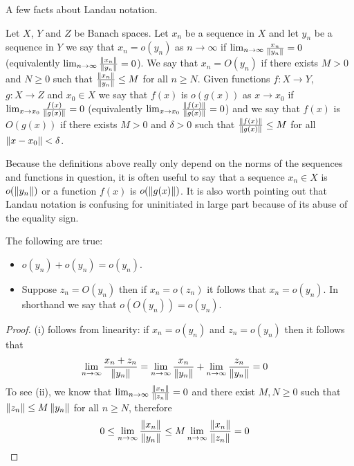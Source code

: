 A few facts about Landau notation.
\begin{defn}Let $X$, $Y$ and $Z$ be Banach spaces.  Let $x_n$ be a sequence in $X$ and let
  $y_n$ be a sequence in  $Y$ we say that $x_n = o(y_n)$
  as $n \to \infty$ if $\lim_{n \to \infty} \frac{x_n}{\left \lVert y_n \right \rVert} =
  0$ (equivalently $\lim_{n \to \infty} \frac{\left \lVert x_n \right \rVert}{\left \lVert y_n \right \rVert} =
  0$).  We say that $x_n = O(y_n)$ if there exists $M > 0$ and $N \geq
  0$ such that
  $\frac{\left \lVert x_n \right \rVert}{\left \lVert y_n \right \rVert}  \leq M$ for all $n \geq N$.  
Given functions $f : X \to Y$, $g : X \to Z$ and $x_0 \in X$ we say that
  $f(x)$ is $o(g(x))$ as $x \to x_0$ if $\lim_{x \to x_0}
  \frac{f(x)}{\left \lVert g(x) \right \rVert} = 0$ (equivalently $\lim_{x \to x_0}
  \frac{\left \lVert f(x) \right \rVert}{\left \lVert g(x) \right \rVert} = 0$) and we say that $f(x)$ is
  $O(g(x))$ if there exists $M > 0$ and $\delta > 0$ such that
  $\frac{\left \lVert f(x) \right \rVert}{\left \lVert g(x) \right \rVert} \leq M$ for all $\left \lVert x - x_0 \right \rVert < \delta$.
\end{defn}
Because the definitions above really only depend on the norms of the
sequences and functions in question, it is often useful to say that a
sequence $x_n \in X$ is $o(\left \lVert y_n \right \rVert)$ or a function $f(x)$ is
$o(\left \lVert g(x) \right \rVert)$.  It is also worth pointing out that Landau notation
is confusing for uninitiated in large part because of its abuse of the
equality sign.  

\begin{prop}\label{LandauNotationIdentities}The following are true:
\begin{itemize}
\item[(i)] $o(y_n) + o(y_n) = o(y_n)$.
\item[(ii)] Suppose $z_n = O(y_n)$ then if $x_n = o(z_n)$ it follows
  that $x_n = o(y_n)$.  In shorthand we say that $o(O(y_n)) = o(y_n)$.
\end{itemize}
\end{prop}
\begin{proof}
(i) follows from linearity: if $x_n = o(y_n)$ and $z_n = o(y_n)$ then
it follows that 
\begin{align*}
\lim_{n \to \infty} \frac{x_n + z_n}{\left \lVert y_n \right \rVert} &= 
\lim_{n \to \infty} \frac{x_n}{\left \lVert y_n \right \rVert}
+ \lim_{n \to \infty} \frac{z_n}{\left \lVert y_n \right \rVert}
= 0
\end{align*}
To see (ii), we know that $\lim_{n \to \infty} \frac{\left \lVert x_n \right \rVert}{\left \lVert z_n \right \rVert} =
0$ and there exist $M,N \geq 0$ such that $\left \lVert z_n \right \rVert \leq M
\left \lVert y_n \right \rVert$ for all $n \geq N$, therefore 
\begin{align*}
0 &\leq \lim_{n \to \infty} \frac{\left \lVert x_n \right \rVert}{\left \lVert y_n \right \rVert} \leq M \lim_{n \to \infty}
\frac{\left \lVert x_n \right \rVert}{\left \lVert z_n \right \rVert} = 0
\end{align*}
\end{proof}


